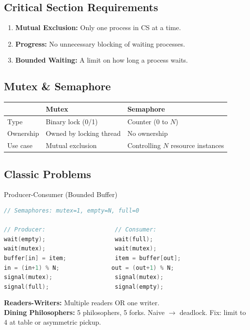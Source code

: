 \documentclass[12pt,a4paper]{article}
\begin{document}
\subsection{Critical Section Requirements}
\begin{enumerate}
    \item \textbf{Mutual Exclusion:} Only one process in CS at a time.
    \item \textbf{Progress:} No unnecessary blocking of waiting processes.
    \item \textbf{Bounded Waiting:} A limit on how long a process waits.
\end{enumerate}

\subsection{Mutex \& Semaphore}
\begin{center}
\begin{tabular}{@{} l p{5.5cm} p{5.5cm} @{}}
\toprule
& \textbf{Mutex} & \textbf{Semaphore} \\
\midrule
Type & Binary lock (0/1) & Counter (0 to $N$) \\
Ownership & Owned by locking thread & No ownership \\
Use case & Mutual exclusion & Controlling $N$ resource instances \\
\bottomrule
\end{tabular}
\end{center}

\subsection{Classic Problems}
\begin{examplebox}{Producer-Consumer (Bounded Buffer)}
\begin{lstlisting}[language=C,escapechar=@]
// Semaphores: mutex=1, empty=N, full=0

// Producer:                    // Consumer:
wait(empty);                    wait(full);
wait(mutex);                    wait(mutex);
buffer[in] = item;              item = buffer[out];
in = (in+1) % N;               out = (out+1) % N;
signal(mutex);                  signal(mutex);
signal(full);                   signal(empty);
\end{lstlisting}
\end{examplebox}

\textbf{Readers-Writers:} Multiple readers OR one writer. \\
\textbf{Dining Philosophers:} 5 philosophers, 5 forks. Naive $\rightarrow$ deadlock. Fix: limit to 4 at table or asymmetric pickup.
\end{document}
